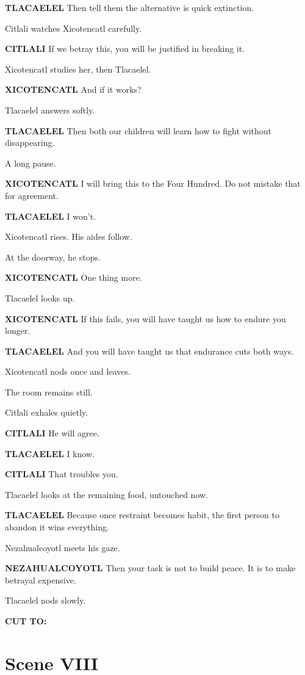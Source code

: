 \documentclass[12pt]{article}
\begin{document}
\textbf{TLACAELEL}  
Then tell them the alternative  
is quick extinction.

Citlali watches Xicotencatl carefully.

\textbf{CITLALI}  
If we betray this,  
you will be justified in breaking it.

Xicotencatl studies her, then Tlacaelel.

\textbf{XICOTENCATL}  
And if it works?

Tlacaelel answers softly.

\textbf{TLACAELEL}  
Then both our children  
will learn how to fight without disappearing.

A long pause.

\textbf{XICOTENCATL}  
I will bring this to the Four Hundred.  
Do not mistake that for agreement.

\textbf{TLACAELEL}  
I won’t.

Xicotencatl rises. His aides follow.

At the doorway, he stops.

\textbf{XICOTENCATL}  
One thing more.

Tlacaelel looks up.

\textbf{XICOTENCATL}  
If this fails,  
you will have taught us how to endure you longer.

\textbf{TLACAELEL}  
And you will have taught us  
that endurance cuts both ways.

Xicotencatl nods once and leaves.

The room remains still.

Citlali exhales quietly.

\textbf{CITLALI}  
He will agree.

\textbf{TLACAELEL}  
I know.

\textbf{CITLALI}  
That troubles you.

Tlacaelel looks at the remaining food, untouched now.

\textbf{TLACAELEL}  
Because once restraint becomes habit,  
the first person to abandon it  
wins everything.

Nezahualcoyotl meets his gaze.

\textbf{NEZAHUALCOYOTL}  
Then your task is not to build peace.  
It is to make betrayal expensive.

Tlacaelel nods slowly.

\textbf{CUT TO:}

\section*{Scene VIII}
\end{document}
